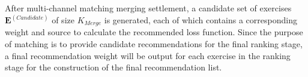 

After multi-channel matching merging settlement, a candidate set of exercises \(\mathbf{E}^{(Candidate)}\) of size \(K_{Merge}\) is generated, each of which contains a corresponding weight and source to calculate the recommended loss function. Since the purpose of matching is to provide candidate recommendations for the final ranking stage, a final recommendation weight will be output for each exercise in the ranking stage for the construction of the final recommendation list.


